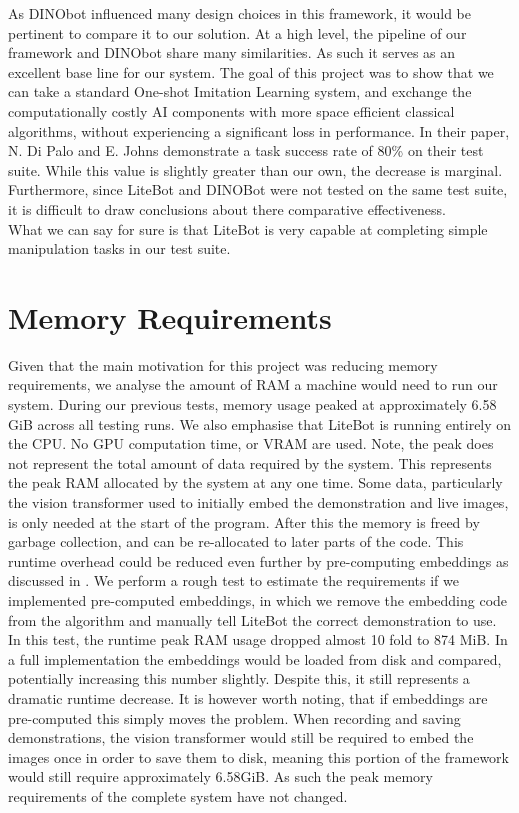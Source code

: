 As DINObot influenced many design choices in this framework, it would be pertinent to compare it to our solution. At a high level, the pipeline of our framework and DINObot share many similarities. As such it serves as an excellent base line for our system. The goal of this project was to show that we can take a standard One-shot Imitation Learning system, and exchange the computationally costly AI components with more space efficient classical algorithms, without experiencing a significant loss in performance. In their paper, N. Di Palo and E. Johns demonstrate a task success rate of 80\% on their test suite. While this value is slightly greater than our own, the decrease is marginal. Furthermore, since LiteBot and DINOBot were not tested on the same test suite, it is difficult to draw conclusions about there comparative effectiveness.\\

What we can say for sure is that LiteBot is very capable at completing simple manipulation tasks in our test suite. %

\section{Memory Requirements}
Given that the main motivation for this project was reducing memory requirements, we analyse the amount of RAM a machine would need to run our system. During our previous tests, memory usage peaked at approximately 6.58 GiB across all testing runs. We also emphasise that LiteBot is running entirely on the CPU. No GPU computation time, or VRAM are used. Note, the peak does not represent the total amount of data required by the system. This represents the peak RAM allocated by the system at any one time. Some data, particularly the vision transformer used to initially embed the demonstration and live images, is only needed at the start of the program. After this the memory is freed by garbage collection, and can be re-allocated to later parts of the code. This runtime overhead could be reduced even further by pre-computing embeddings as discussed in . We perform a rough test to estimate the requirements if we implemented pre-computed embeddings, in which we remove the embedding code from the algorithm and manually tell LiteBot the correct demonstration to use. In this test, the runtime peak RAM usage dropped almost 10 fold to 874 MiB. In a full implementation the embeddings would be loaded from disk and compared, potentially increasing this number slightly. Despite this, it still represents a dramatic runtime decrease. It is however worth noting, that if embeddings are pre-computed this simply moves the problem. When recording and saving demonstrations, the vision transformer would still be required to embed the images once in order to save them to disk, meaning this portion of the framework would still require approximately 6.58GiB. As such the peak memory requirements of the complete system have not changed.\\

